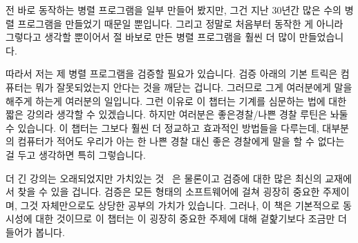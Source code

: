 
%

전 바로 동작하는 병렬 프로그램을 일부 만들어 봤지만, 그건 지난 30년간 많은 수의
병렬 프로그램을 만들었기 때문일 뿐입니다.
그리고 정말로 처음부터 동작한 게 아니라 그렇다고 생각할 뿐이어서 절 바보로 만든
병렬 프로그램을 훨씬 더 많이 만들었습니다.

따라서 저는 제 병렬 프로그램을 검증할 필요가 있습니다.
검증 아래의 기본 트릭은 컴퓨터는 뭐가 잘못되었는지 안다는 것을 깨닫는 겁니다.
그러므로 그게 여러분에게 말을 해주게 하는게 여러분의 일입니다.
그런 이유로 이 챕터는 기계를 심문하는 법에 대한 짧은 강의라 생각할 수
있겠습니다.
하지만 여러분은 좋은경찰/나쁜 경찰 루틴은 놔둘 수 있습니다.
이 챕터는 그보다 훨씬 더 정교하고 효과적인 방법들을 다루는데, 대부분의 컴퓨터가
적어도 우리가 아는 한 나쁜 경찰 대신 좋은 경찰에게 말을 할 수 없다는 걸 두고
생각하면 특히 그렇습니다.

더 긴 강의는 오래되었지만 가치있는 것~\cite{GlenfordJMyers1979} 은 물론이고
검증에 대한 많은 최신의 교재에서 찾을 수 있을 겁니다.
검증은 모든 형태의 소프트웨어에 걸쳐 굉장히 중요한 주제이며, 그것 자체만으로도
상당한 공부의 가치가 있습니다.
그러나, 이 책은 기본적으로 동시성에 대한 것이므로 이 챕터는 이 굉장히 중요한
주제에 대해 겉핥기보다 조금만 더 들어가 봅니다.

\iffalse

